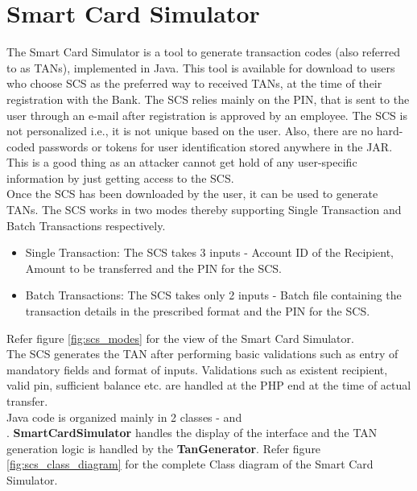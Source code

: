 \section{Smart Card Simulator} \label{section_scs}

The Smart Card Simulator is a tool to generate transaction codes (also referred to as TANs), implemented in Java. This tool is available for download to users who choose SCS as the preferred way to received TANs, at the time of their registration with the Bank. The SCS relies mainly on the PIN, that is sent to the user through an e-mail after registration is approved by an employee.
The SCS is not personalized i.e., it is not unique based on the user. Also, there
are no hard-coded passwords or tokens for user identification stored anywhere in
the JAR. This is a good thing as an attacker cannot get hold of any user-specific
information by just getting access to the SCS. \\

Once the SCS has been downloaded by the user, it can be used to generate TANs. The SCS works in two modes thereby supporting Single Transaction and Batch Transactions respectively.
\begin{itemize}
\item Single Transaction: The SCS takes 3 inputs - Account ID of the Recipient, Amount to be transferred and the PIN for the SCS. 
\item Batch Transactions: The SCS takes only 2 inputs - Batch file containing the transaction details in the prescribed format and the PIN for the SCS.
\end{itemize}
Refer figure \ref{fig:scs_modes} for the view of the Smart Card Simulator. \\

The SCS generates the TAN after performing basic validations such as entry of mandatory fields and format of inputs. Validations such as existent recipient, valid pin, sufficient balance etc. are handled at the PHP end at the time of actual transfer. \\

Java code is organized mainly in 2 classes -  and \\ . \textbf{SmartCardSimulator} handles the display of the interface and the TAN generation logic is handled by the \textbf{TanGenerator}.
Refer figure \ref{fig:scs_class_diagram} for the complete Class diagram of the Smart Card Simulator.

